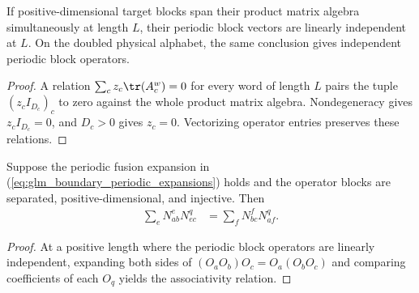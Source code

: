 \begin{lemma}
    \leanok
    \label{thm:glm_boundary_periodic_independence}
    If positive-dimensional target blocks span their product matrix
    algebra simultaneously at length $L$, their periodic block vectors
    are linearly independent at $L$. On the doubled physical alphabet,
    the same conclusion gives independent periodic block operators.
\end{lemma}
\begin{proof}
    \leanok
    A relation $\sum_c z_c\tr(A_c^w)=0$ for every word of length $L$
    pairs the tuple $(z_cI_{D_c})_c$ to zero against the whole product
    matrix algebra. Nondegeneracy gives $z_cI_{D_c}=0$, and $D_c>0$
    gives $z_c=0$. Vectorizing operator entries preserves these relations.
\end{proof}

\begin{lemma}
    \leanok
    \label{thm:glm_boundary_fusion_associative}
    Suppose the periodic fusion expansion in
    (\ref{eq:glm_boundary_periodic_expansions}) holds and the operator
    blocks are separated, positive-dimensional, and injective. Then
    \begin{align}
        \sum_eN_{ab}^eN_{ec}^q & =\sum_fN_{bc}^fN_{af}^q.
        \label{eq:glm_boundary_fusion_associative}
    \end{align}
\end{lemma}
\begin{proof}
    \leanok
    At a positive length where the periodic block operators are linearly
    independent, expanding both sides of $(O_aO_b)O_c=O_a(O_bO_c)$ and
    comparing coefficients of each $O_q$ yields the associativity relation.
\end{proof}

